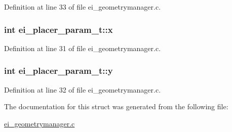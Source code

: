 Definition at line 33 of file ei\-\_\-geometrymanager.\-c.

\hypertarget{structei__placer__param__t_ae78bc39546bd3ad67ce7eea6cf70f699}{
\subsubsection[{x}]{\setlength{\rightskip}{0pt plus 5cm}int ei\-\_\-placer\-\_\-param\-\_\-t\-::x}}\label{structei__placer__param__t_ae78bc39546bd3ad67ce7eea6cf70f699}


Definition at line 31 of file ei\-\_\-geometrymanager.\-c.

\hypertarget{structei__placer__param__t_ac82ce34e765d6021615c06d65b212d50}{
\subsubsection[{y}]{\setlength{\rightskip}{0pt plus 5cm}int ei\-\_\-placer\-\_\-param\-\_\-t\-::y}}\label{structei__placer__param__t_ac82ce34e765d6021615c06d65b212d50}


Definition at line 32 of file ei\-\_\-geometrymanager.\-c.



The documentation for this struct was generated from the following file\-:\begin{DoxyCompactItemize}
\item 
\hyperlink{ei__geometrymanager_8c}{ei\-\_\-geometrymanager.\-c}\end{DoxyCompactItemize}
